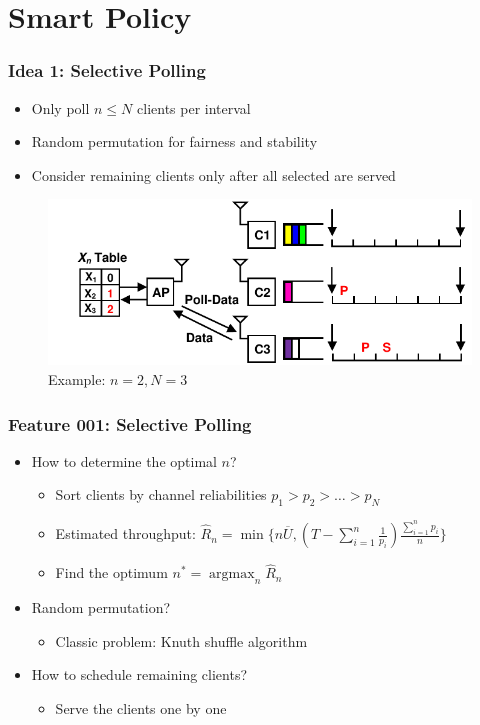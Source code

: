 \documentclass{beamer}
\newcommand{\argmax}{\operatorname{argmax}}
\begin{document}
\section{Smart Policy}

\begin{frame}
\frametitle{Idea 1: Selective Polling}
\begin{itemize}
\item Only poll $n \le N$ clients per interval
\item Random permutation for fairness and stability
\item Consider remaining clients only after all selected are served
\end{itemize}
\begin{figure}
\centering
\includegraphics[scale=0.8]{selective_1.pdf}
\caption{Example: $n=2, N=3$}
\end{figure}
\end{frame}

\begin{frame}
\frametitle{Feature 001: Selective Polling}
\begin{itemize}
\item How to determine the optimal $n$?
  \begin{itemize}
    \item Sort clients by channel reliabilities $p_1 > p_2 > \dots > p_N$
    \item Estimated throughput: $\hat{R}_n = \min\{n\overline{U}, (T-\sum_{i=1}^{n}\frac{1}{p_i})\frac{\sum_{i=1}^{n}p_i}{n} \}$
    \item Find the optimum $n^* = \argmax_{n} \hat{R}_n$
  \end{itemize}
\item Random permutation?
  \begin{itemize}
    \item Classic problem: Knuth shuffle algorithm
  \end{itemize}
\item How to schedule remaining clients?
  \begin{itemize}
    \item Serve the clients one by one
  \end{itemize}
\end{itemize}
\end{frame}
\end{document}
